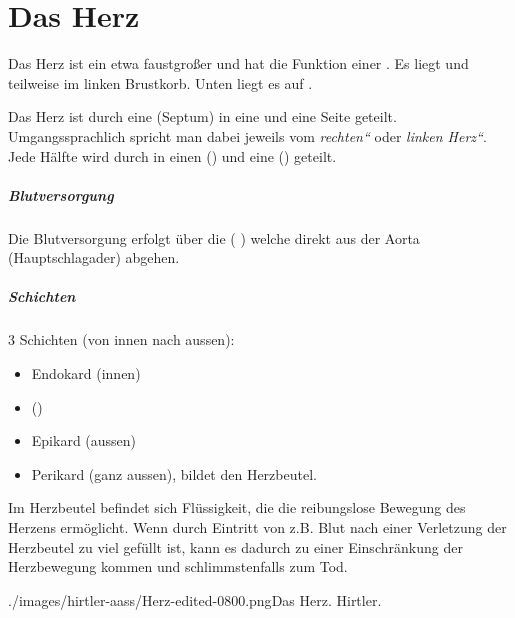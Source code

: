 \clearpage
\section{Das Herz}

{
Das Herz ist ein etwa faustgroßer  und
hat die Funktion einer . Es liegt  und
teilweise im linken Brustkorb. Unten liegt es auf .

 Das Herz ist durch eine  (Septum) in eine
 und eine  Seite geteilt.
Umgangssprachlich spricht man dabei jeweils vom
\emph{{\quotedblbase}rechten{\textquotedblleft}} oder
\emph{{\quotedblbase}linken Herz{\textquotedblleft}}. Jede
Hälfte wird durch  in einen 
() und eine  ()
geteilt.

\subparagraph{Blutversorgung}

Die Blutversorgung erfolgt über die
  
(  ) welche direkt
aus der Aorta (Hauptschlagader) abgehen.

\subparagraph{Schichten}

3 Schichten (von innen nach aussen):
\begin{itemize}
\item Endokard (innen)      
\item {} ()  
\item Epikard (aussen)  
\item Perikard (ganz aussen), bildet den Herzbeutel.
\end{itemize}

Im Herzbeutel befindet sich Flüssigkeit, die die reibungslose Bewegung des
Herzens ermöglicht. Wenn durch Eintritt von z.B. Blut nach einer Verletzung der
Herzbeutel zu viel gefüllt ist, kann es dadurch zu einer Einschränkung der
Herzbewegung kommen und schlimmstenfalls zum Tod.
}{}{./images/hirtler-aass/Herz-edited-0800.png}{\gAuthNotesPicLegalOk{}{}Das Herz.} {Hirtler.}

